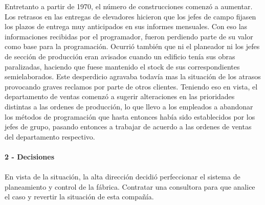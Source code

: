 \documentclass[a4paper,10pt,titlepage]{article}
\begin{document}
		\indent Entretanto a partir de 1970, el n\'umero de construcciones comenz\'o a aumentar. Los retrasos en las entregas de elevadores hicieron que los jefes de campo fijasen los plazos de entrega muy anticipados en sus informes mensuales. Con eso las informaciones recibidas por el programador, fueron perdiendo parte de su valor como base para la programaci\'on. Ocurri\'o tambi\'en que ni el planeador ni los jefes de secci\'on de producci\'on eran avisados cuando un edificio ten\'ia sus obras paralizadas, haciendo que fuese mantenido el stock de sus correspondientes semielaborados. Este desperdicio agravaba todav\'ia mas la situaci\'on de los atrasos provocando graves reclamos por parte de otros clientes. Teniendo eso en vista, el departamento de ventas comenz\'o a sugerir alteraciones en las prioridades distintas a las ordenes de producci\'on, lo que llevo a los empleados a abandonar los m\'etodos de programaci\'on que hasta entonces hab\'ia sido establecidos por los jefes de grupo, pasando entonces a trabajar de acuerdo a las ordenes de ventas del departamento respectivo.\\\\

	\textbf{2 - Decisiones}\\\\
		\indent En vista de la situaci\'on, la alta direcci\'on decidi\'o perfeccionar el sistema de planeamiento y control de la f\'abrica. Contratar una consultora para que analice el caso y revertir la situaci\'on de esta compa\~n\'ia.\\ 
\newpage
\end{document}
